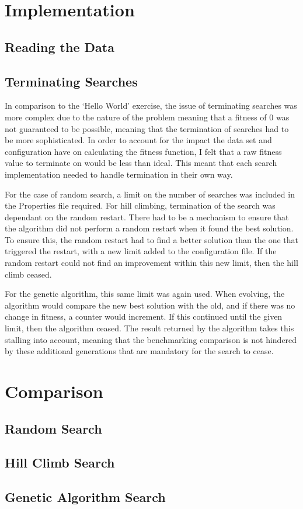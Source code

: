 \documentclass[11pt, a4paper]{article}
\begin{document}
\section{Implementation}
\subsection{Reading the Data}


\subsection{Terminating Searches}
In comparison to the `Hello World' exercise, the issue of terminating searches
was more complex due to the nature of the problem meaning that a fitness of 0
was not guaranteed to be possible, meaning that the termination of searches had
to be more sophisticated. In order to account for the impact the data set and
configuration have on calculating the fitness function, I felt that a raw
fitness value to terminate on would be less than ideal. This meant that each
search implementation needed to handle termination in their own way.

For the case of random search, a limit on the number of searches was included
in the Properties file required. For hill climbing, termination of the search
was dependant on the random restart. There had to be a mechanism to ensure that
the algorithm did not perform a random restart when it found the best solution.
To ensure this, the random restart had to find a better solution than the one
that triggered the restart, with a new limit added to the configuration file. If
the random restart could not find an improvement within this new limit, then the
hill climb ceased.

For the genetic algorithm, this same limit was again used. When evolving, the
algorithm would compare the new best solution with the old, and if there was no
change in fitness, a counter would increment. If this continued until the given
limit, then the algorithm ceased. The result returned by the algorithm takes
this stalling into account, meaning that the benchmarking comparison is not
hindered by these additional generations that are mandatory for the search to
cease.

\section{Comparison}
\subsection{Random Search}
\subsection{Hill Climb Search}
\subsection{Genetic Algorithm Search}


 
\end{document}
